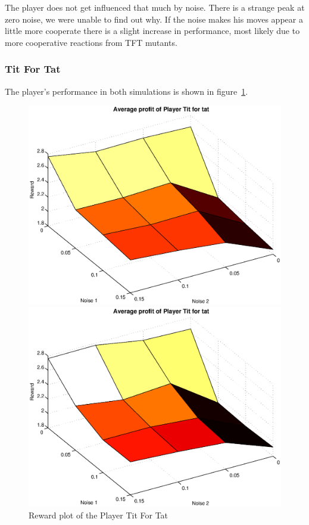 The player does not get influenced that much by noise. There is a strange peak at zero noise, we were unable to find out why. If the noise makes his moves appear a little more cooperate there is a slight increase in performance, most likely due to more cooperative reactions from TFT mutants.

\subsubsection{Tit For Tat}
The player's performance in both simulations is shown in figure~\ref{pic player tit for tat}.\\
\begin{figure}[h]

\begin{minipage}[hbt]{0.65\textwidth}
	\centering
	\includegraphics[width=\textwidth]{pics/simulation1/Reward_vs_Noise_of_Player_Tit_for_tat}
\end{minipage}
\hfill
\begin{minipage}[hbt]{0.3\textwidth}
	\centering
	\includegraphics[width=\textwidth]{pics/simulation2/Reward_vs_Noise_of_Player_Tit_for_tat}
\end{minipage}
	\caption{Reward plot of the Player Tit For Tat}
	\label{pic player tit for tat}
\end{figure}

